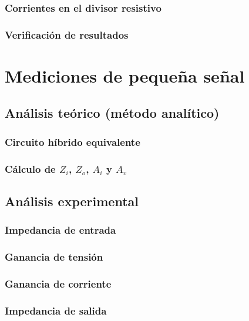 \documentclass[chaptersright]{informeutn}
\begin{document}
    \subsection{Corrientes en el divisor resistivo}
    \subsection{Verificación de resultados}

\chapter{Mediciones de pequeña señal}
  \section{Análisis teórico (método analítico)}
    \subsection{Circuito híbrido equivalente}
    \subsection{Cálculo de $Z_i$, $Z_o$, $A_i$ y $A_v$}
  \section{Análisis experimental}
    \subsection{Impedancia de entrada}
    \subsection{Ganancia de tensión}
    \subsection{Ganancia de corriente}
    \subsection{Impedancia de salida}
\end{document}
